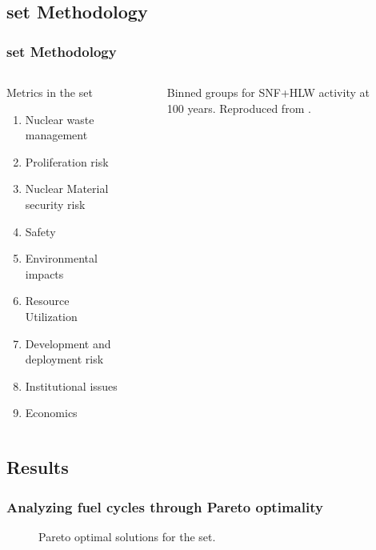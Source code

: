\subsection{\gls{set} Methodology}
\begin{frame}
    \frametitle{\gls{set} Methodology}
    \begin{columns}
        \column[t]{3.5cm}
        \begin{block}{Metrics in the \gls{set}}
            \begin{enumerate}
                \item Nuclear waste management
                \item Proliferation risk
                \item Nuclear Material security risk
                \item Safety
                \item Environmental impacts
                \item Resource Utilization
                \item Development and deployment risk
                \item Institutional issues
                \item Economics
            \end{enumerate}        
        \end{block}
        \column[t]{6.5cm}
          \begin{figure}[htbp!]
            \begin{center}
            \resizebox{\columnwidth}{!}{}
            \end{center}
                \caption{Binned groups for SNF+HLW activity at 100 years.
                Reproduced from \cite{wigeland_nuclear_2014}.}
            \label{fig:set_activity_bin}
        \end{figure}
    \end{columns}
\end{frame}

\subsection{Results}
\begin{frame}
    \frametitle{Analyzing fuel cycles through Pareto optimality}
        
  \begin{figure}[htbp!]
    \begin{center}
      \resizebox{0.9\columnwidth}{!}{}
    \end{center}
          \caption{Pareto optimal solutions for the \gls{set}.}
    \label{fig:full-set-pcp}
  \end{figure}
\end{frame}

